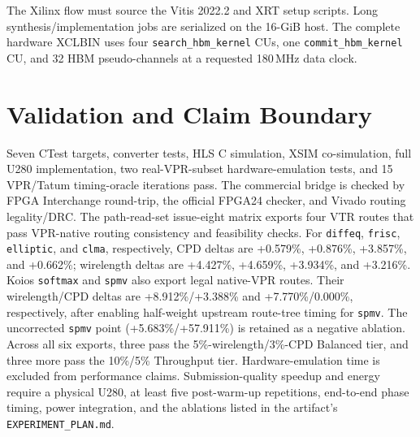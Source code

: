 \documentclass[sigconf,anonymous]{acmart}
\begin{document}
The Xilinx flow must source the Vitis 2022.2 and XRT setup scripts. Long
synthesis/implementation jobs are serialized on the 16-GiB host. The complete
hardware XCLBIN uses four \texttt{search\_hbm\_kernel} CUs, one
\texttt{commit\_hbm\_kernel} CU, and 32 HBM pseudo-channels at a requested
180\,MHz data clock.

\section{Validation and Claim Boundary}

Seven CTest targets, converter tests, HLS C simulation, XSIM co-simulation,
full U280 implementation, two real-VPR-subset hardware-emulation tests, and 15
VPR/Tatum timing-oracle iterations pass. The commercial bridge is checked by
FPGA Interchange round-trip, the official FPGA24 checker, and Vivado routing
legality/DRC. The path-read-set issue-eight matrix exports four VTR routes that
pass VPR-native routing consistency and feasibility checks. For
\texttt{diffeq}, \texttt{frisc}, \texttt{elliptic}, and \texttt{clma},
respectively, CPD deltas are +0.579\%, +0.876\%, +3.857\%, and +0.662\%;
wirelength deltas are +4.427\%, +4.659\%, +3.934\%, and +3.216\%.
Koios \texttt{softmax} and \texttt{spmv} also export legal native-VPR routes.
Their wirelength/CPD deltas are +8.912\%/+3.388\% and
+7.770\%/0.000\%, respectively, after enabling half-weight upstream
route-tree timing for \texttt{spmv}. The uncorrected \texttt{spmv} point
(+5.683\%/+57.911\%) is retained as a negative ablation.
Across all six exports, three pass the 5\%-wirelength/3\%-CPD Balanced tier,
and three more pass the 10\%/5\% Throughput tier.
Hardware-emulation time is excluded from performance claims.
Submission-quality speedup and energy require a physical U280, at least five
post-warm-up repetitions, end-to-end phase timing, power integration, and the
ablations listed in the artifact's \texttt{EXPERIMENT\_PLAN.md}.
\end{document}
